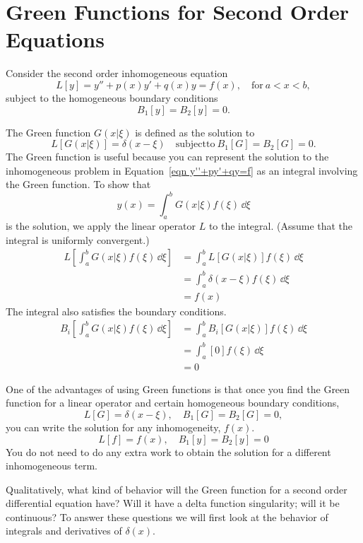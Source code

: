 \section{Green Functions for Second Order Equations}


Consider the second order inhomogeneous equation
\begin{equation}
  \label{eqn y''+py'+qy=f}
  L[y] = y'' + p(x) y' + q(x) y = f(x), \quad \mathrm{for}\ a < x < b,
\end{equation}
subject to the homogeneous boundary conditions
\[ 
B_1[y] = B_2[y] = 0.
\]

The Green function $G(x|\xi)$ is defined as the solution to
\[ 
L[G(x|\xi)] = \delta(x-\xi) \quad \mathrm{subject to}\ B_1[G]=B_2[G]=0.
\]
The Green function is useful because you can represent the 
solution to the inhomogeneous problem in Equation~\ref{eqn y''+py'+qy=f}
as an integral involving the Green function.  To show that
\[
y(x) = \int_a^b G(x|\xi) f(\xi)\,\dd \xi
\]
is the solution, we apply the linear operator $L$ to the integral.
(Assume that the integral is uniformly convergent.)
\begin{align*}
  L\left[ \int_a^b G(x|\xi) f(\xi)\,\dd \xi\right] 
  &= \int_a^b L[G(x|\xi)] f(\xi)\,\dd \xi 
  \\
  &= \int_a^b \delta(x-\xi) f(\xi)\,\dd \xi 
  \\
  &= f(x)
\end{align*}
The integral also satisfies the boundary conditions.
\begin{align*}
  B_i\left[ \int_a^b G(x|\xi) f(\xi)\,\dd \xi\right]
  &= \int_a^b B_i[G(x|\xi)] f(\xi)\,\dd \xi 
  \\
  &= \int_a^b [0] f(\xi)\,\dd \xi 
  \\
  &= 0
\end{align*}

One of the advantages of using Green functions is that once you find 
the Green function for a linear operator and certain homogeneous boundary 
conditions, 
\[
L[G] = \delta(x-\xi), \quad B_1[G] = B_2[G] = 0,
\]
you can write the solution
for any inhomogeneity, $f(x)$.  
\[
L[f] = f(x), \quad B_1[y] = B_2[y] = 0
\]
You do not need to do any extra work to 
obtain the solution for a different inhomogeneous term.

Qualitatively, what kind of behavior will the Green function for 
a second order differential equation have?  Will it have a delta function
singularity; will it be continuous?  To answer these questions
we will first look at the behavior of integrals and derivatives of $\delta(x)$.

